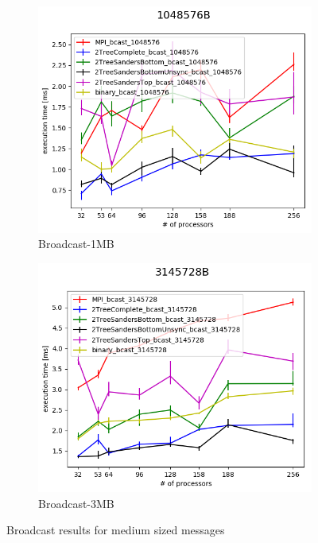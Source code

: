 \documentclass[sigplan,review,anonymous]{acmart}\settopmatter{printfolios=true,printccs=false,printacmref=false}
\begin{document}
\begin{figure}
\centering
\begin{subfigure}{.25\textwidth}
  \centering
  \includegraphics[width=1\linewidth]{images/Results/bcast_all_1048576B.png}
  \caption{Broadcast-1MB}
  \label{bcast-selected-3MB}
\end{subfigure}%
\begin{subfigure}{.25\textwidth}
  \centering
  \includegraphics[width=1\linewidth]{images/Results/bcast_all_3145728B.png}
  \caption{Broadcast-3MB}
  \label{bcast-selected-3MB}
\end{subfigure}
\caption{Broadcast results for medium sized messages}
\label{graph-bcast-medium1-selected}
\end{figure}
\end{document}
